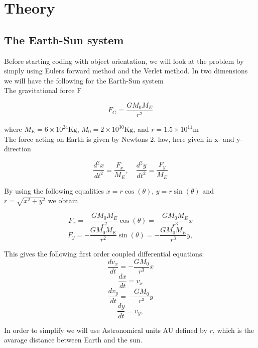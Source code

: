 \documentclass[../main.tex]{subfiles}
\begin{document}
\section{Theory}\label{theory}
\subsection{The Earth-Sun system}
Before starting coding with object orientation, we will look at the problem by simply using Eulers forward method and the Verlet method.
In two dimensions we will have the following for the Earth-Sun system \\

The gravitational force  $\text{F}$

\begin{equation}
  F_G= \frac{GM_0M_E}{r^2} 
\end{equation}

where $M_E = 6\times 10^{24}\text{Kg}$,  $ M_0 = 2\times 10^{30}\text{Kg}$, and  $r = 1.5\times 10^{11}\text{m}$\\ The force acting on Earth is given by Newtons 2. law, here given in x- and y- direction

$$ \frac{d^2x}{dt^2} = \frac{F_x}{M_E}, \quad \frac{d^2y}{dt^2} = \frac{F_y}{M_E}$$

By using the following equalities $x = r \cos(\theta)$,  $y = r\sin(\theta)$ and $r = \sqrt{x^2 +y^2}$ we obtain

\begin{equation}
  F_x = - \frac{GM_0M_E}{r^2} \cos(\theta) =- \frac{GM_0M_E}{r^3}x
\end{equation}
\begin{equation}
  F_y = - \frac{GM_0M_E}{r^2}\sin(\theta) =- \frac{GM_0M_E}{r^3}y,
\end{equation}

This gives the following first order  coupled differential equations:
\begin{equation}
  \frac{dv_x}{dt} = - \frac{GM_0}{r^3}x
\end{equation}
\begin{equation}
  \frac{dx}{dt} = v_x
\end{equation}
\begin{equation}
  \frac{dv_y}{dt} = - \frac{GM_0}{r^3}y
\end{equation}
\begin{equation}
  \frac{dy}{dt} = v_y,
\end{equation}

In order to simplify we will use Astronomical units AU defined by $r$, which is the avarage distance between Earth and the sun.
\end{document}
